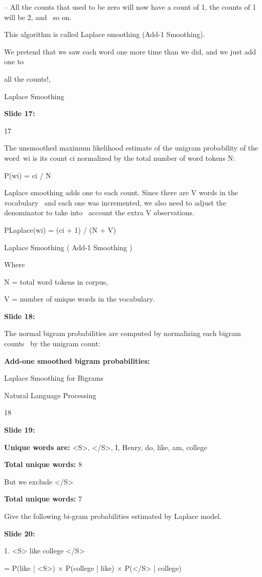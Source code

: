 \documentclass[11pt,a4paper]{article}
\begin{document}
–	All the counts that used to be zero will now have a count of 1, the counts of 1 will be 2, and  so on.

This algorithm is called Laplace smoothing (Add-1 Smoothing).

We pretend that we saw each word one more time than we did, and we just add one to

all the counts!,

Laplace Smoothing

\textbf{Slide 17:}

17

The unsmoothed maximum likelihood estimate of the unigram probability of the word wi is its count ci normalized by the total number of word tokens N:

P(wi) = ci / N

Laplace smoothing adds one to each count. Since there are V words in the vocabulary  and each one was incremented, we also need to adjust the denominator to take into  account the extra V observations.

PLaplace(wi) = (ci + 1) / (N + V)

Laplace Smoothing  ( Add-1 Smoothing )

Where

N = total word tokens in corpus,

V = number of unique words in the vocabulary.

\textbf{Slide 18:}

The normal bigram probabilities are computed by normalizing each bigram counts  by the unigram count:

\textbf{Add-one smoothed bigram probabilities:} 

Laplace Smoothing for Bigrams

Natural Language Processing

18

\textbf{Slide 19:}

\textbf{Unique words are:}  <S>, </S>, I, Henry, do, like, am, college

\textbf{Total unique words:}  8

But we exclude </S>

\textbf{Total unique words:}  7

Give the following bi-gram probabilities estimated by Laplace model.

\textbf{Slide 20:}

1. <S> like college </S>

= P(like | <S>) × P(college | like) × P(</S> | college)
\end{document}

